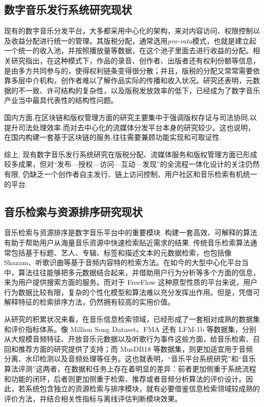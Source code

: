 \subsection{数字音乐发行系统研究现状}

现有的数字音乐分发平台，大多都采用中心化的架构，来对内容访问、权限控制以及收益分配进行统一的管理。其版税分配，通常选用\textit{pro-rata}模式，也就是建立起一个统一的收入池，并按照播放量等数据，在这个池子里面去进行收益的分配\cite{Alaei2022ProRata,Moreau2024PaymentModels}。相关研究指出，在这种模式下，作品的录音、创作者、出版者还有权利份额等信息，是由多方共同参与的，使得权利链条变得很分散；并且，版税的分配又常常需要依靠多层中介机构，创作者难以了解作品实际的传播和收入状况\cite{Torbensen2019,Arenal2024}。研究还表明，元数据的不一致、许可结构的复杂性，以及版税发放效率的低下，已经成为了数字音乐产业当中最具代表性的结构性问题\cite{Torbensen2019,Arenal2024}。

国内方面,在区块链和版权管理方面的研究主要集中于强调版权存证与司法协同,以提升司法处理效率\cite{chinaCopyrightChain2021,beijingCopyrightChain2022}.而对去中心化的流媒体分发平台本身的研究较少。这也说明，在国内构建一套基于区块链的服务,往往需要兼顾功能实现和可取证性\cite{chinaCopyrightChain2021,beijingCopyrightChain2022}.

综上, 现有数字音乐发行系统研究在版税分配、流媒体服务和版权管理方面已形成较多成果，但对“发布—授权—访问—互动—发现”的全流程一体化设计的关注仍然有限, 仍缺乏一个创作者自主发行、链上访问控制、用户社区和音乐检索有机统一的平台\cite{Li2021,Niu2022,Shi2025}.

\subsection{音乐检索与资源排序研究现状}

音乐检索与资源排序是数字音乐平台中的重要模块. 构建一套高效、可解释的算法有助于帮助用户从海量音乐资源中快速检索贴近需求的结果. 传统音乐检索算法通常包括基于标题、艺人、专辑、标签和描述文本的元数据检索，也包括像 Shazam、听歌识曲等基于音频内容特的检索方法。在如今的大型中心化平台当中，算法往往能够把多元数据结合起来，并借助用户行为分析等多个方面的信息，来为用户提供搜索方面的服务。而对于 FreeFlow 这种原型性质的平台来说，用户行为数据比较有限，复杂的个性化模型和算法难以充分发挥出作用。但是，凭借可解释特征的检索排序方法，仍然拥有较高的实用价值。

从研究的积累状况来看，在音乐信息检索领域，已经形成了一套相对成熟的数据集和评价指标体系。像 Million Song Dataset、FMA 还有 LFM-1b 等数据集，分别从大规模音频特征、开放音乐元数据以及听歌行为事件这些方面，给音乐检索、召回和推荐方面的研究提供了支持；而 MusDB18 等数据集，则更加适宜用于音频分离、水印检测以及音频处理等任务。这也就表明，“音乐平台系统研究”和“音乐算法评测”这两者，在数据和任务上存在着明显的差异：前者更加侧重于系统流程和功能的闭环，后者则更加侧重于检索、推荐或者音频分析算法的评价设计。因此，若系统包含独立的资源检索与排序模块，就有必要借鉴信息检索领域较成熟的评价方法，并结合相关性指标与离线评估判断模块效果\cite{msd2011,fma2017,lfm1b2016,musdb18}。

